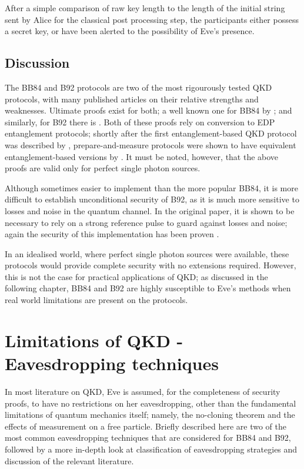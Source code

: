 \documentclass[paper=a4, fontsize=11pt]{scrartcl} %
\numberwithin{equation}{section} %
\numberwithin{figure}{section} %
\numberwithin{table}{section} %
\begin{document}
After a simple comparison of raw key length to the length of the initial string sent by Alice for the classical
post processing step, the participants either possess a secret key, or have been alerted to the possibility
of Eve's presence.

\subsection{Discussion}
The BB84 and B92 protocols are two of the most rigourously tested QKD protocols, with many published articles
on their relative strengths and weaknesses. Ultimate proofs exist for both; a well known one for BB84
by \citet{proofBB84}; and similarly, for B92 there is \citet{tamakiProofB92}. Both of these proofs rely on
conversion to EDP entanglement protocols; shortly after the first entanglement-based QKD protocol was
described by \citet{E91}, prepare-and-measure protocols were shown to have equivalent entanglement-based
versions by \citet{edpEquivProof}. It must be noted, however, that the above proofs are valid only
for perfect single photon sources.

Although sometimes easier to implement than the more popular BB84, it is more difficult to establish
unconditional security of B92, as it is much more sensitive to losses and noise in the
quantum channel. In the original paper, it is shown to be necessary
to rely on a strong reference pulse to guard against
losses and noise; again the security of this implementation has been proven
\citep{tamakiStrongRefProofB92}.

In an idealised world, where perfect single photon sources were available,
these protocols would provide complete security with no extensions required.
However, this is not the case for practical applications of QKD;
as discussed in the following chapter, BB84 and B92 are highly susceptible to
Eve's methods when real world limitations are present on the protocols.

\section{Limitations of QKD - Eavesdropping techniques}
In most literature on QKD, Eve is assumed, for the completeness of security proofs, to have no restrictions
on her eavesdropping, other than the fundamental limitations of quantum mechanics itself; namely, the
no-cloning theorem and the effects of measurement on a free particle. Briefly described here are two of the
most common eavesdropping techniques that are considered for BB84 and B92, followed by a more in-depth look
at classification of eavesdropping strategies and discussion of the relevant literature.
\end{document}
